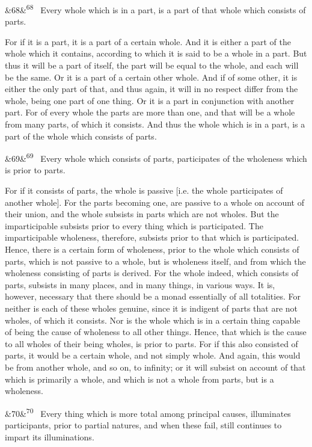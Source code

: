 \documentclass[12pt]{article}
\newcommand{\para}[1][]{\par\noindent\ifx&#1&\else\textsuperscript{\footnotesize #1}~\fi}
\begin{document}
\para[68] Every whole which is in a part, is a part of that whole which consists of parts.

For if it is a part, it is a part of a certain whole. And it is either a part of the whole which it contains, according to which it is said to be a whole in a part. But thus it will be a part of itself, the part will be equal to the whole, and each will be the same. Or it is a part of a certain other whole. And if of some other, it is either the only part of that, and thus again, it will in no respect differ from the whole, being one part of one thing. Or it is a part in conjunction with another part. For of every whole the parts are more than one, and that will be a whole from many parts, of which it consists. And thus the whole which is in a part, is a part of the whole which consists of parts.

\para[69] Every whole which consists of parts, participates of the wholeness which is prior to parts.

For if it consists of parts, the whole is passive [i.e. the whole participates of another whole]. For the parts becoming one, are passive to a whole on account of their union, and the whole subsists in parts which are not wholes. But the imparticipable subsists prior to every thing which is participated. The imparticipable wholeness, therefore, subsists prior to that which is participated. Hence, there is a certain form of wholeness, prior to the whole which consists of parts, which is not passive to a whole, but is wholeness itself, and from which the wholeness consisting of parts is derived. For the whole indeed, which consists of parts, subsists in many places, and in many things, in various ways. It is, however, necessary that there should be a monad essentially of all totalities. For neither is each of these wholes genuine, since it is indigent of parts that are not wholes, of which it consists. Nor is the whole which is in a certain thing capable of being the cause of wholeness to all other things. Hence, that which is the cause to all wholes of their being wholes, is prior to parts. For if this also consisted of parts, it would be a certain whole, and not simply whole. And again, this would be from another whole, and so on, to infinity; or it will subsist on account of that which is primarily a whole, and which is not a whole from parts, but is a wholeness.

\para[70] Every thing which is more total among principal causes, illuminates participants, prior to partial natures, and when these fail, still continues to impart its illuminations.
\end{document}
